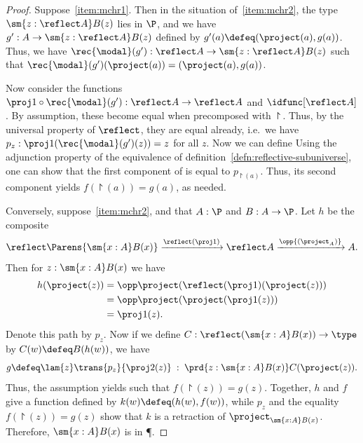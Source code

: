 \begin{proof}
  Suppose~\ref{item:mchr1}.
  Then in the situation of~\ref{item:mchr2}, the type $\sm{z:\reflect A} B(z)$ lies in $\P$, and we have $g':A\to \sm{z:\reflect A} B(z)$ defined by $g'(a)\defeq (\project(a),g(a))$.
  Thus, we have $\rec{\modal}(g'):\reflect A \to \sm{z:\reflect A} B(z)$ such that $\rec{\modal}(g')(\project(a)) = (\project(a),g(a))$.

  Now consider the functions $\proj1 \circ \rec{\modal}(g') : \reflect A \to \reflect A$ and $\idfunc[\reflect A]$.
  By assumption, these become equal when precomposed with $\project$.
  Thus, by the universal property of $\reflect$, they are equal already, i.e.\ we have $p_z:\proj1(\rec{\modal}(g')(z)) = z$ for all $z$.
  Now we can define
  Using the adjunction property of the equivalence of
  definition~\ref{defn:reflective-subuniverse}, one can show that the first component of
  is equal to $p_{\project(a)}$.  Thus, its second component yields
  $f(\project(a)) = g(a)$, as needed.

  Conversely, suppose~\ref{item:mchr2}, and that $A:\P$ and $B:A\to\P$.
  Let $h$ be the composite
  \[ \reflect\Parens{\sm{x:A} B(x)} \xrightarrow{\reflect(\proj1)} \reflect A \xrightarrow{\opp{(\project_A)}} A. \]
  Then for $z:\sm{x:A} B(x)$ we have
  \begin{align*}
    h(\project(z)) &= \opp\project(\reflect(\proj1)(\project(z)))\\
    &= \opp\project(\project(\proj1(z)))\\
    &= \proj1(z).
  \end{align*}
  Denote this path by $p_z$.
  Now if we define $C:\reflect(\sm{x:A} B(x)) \to \type$ by $C(w) \defeq B(h(w))$, we have
  \[ g \defeq \lam{z} \trans{p_z}{\proj2(z)} \;:\; \prd{z:\sm{x:A} B(x)} C(\project(z)). \]
  Thus, the assumption yields
  such that $f(\project(z)) = g(z)$.
  Together, $h$ and $f$ give a function
  defined by $k(w) \defeq (h(w),f(w))$, while $p_z$ and the equality $f(\project(z)) = g(z)$ show that $k$ is a retraction of $\project_{\sm{x:A}B(x)}$.
  Therefore, $\sm{x:A}B(x)$ is in \P.
\end{proof}
